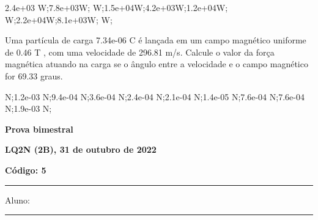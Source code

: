 \documentclass[12pt, addpoints]{exam}
\begin{document}
\begin{questions}
\begin{multicols*}{2}
\begin{oneparchoices}
\choice 2.4e+03 W;\choice 7.8e+03W; W;\choice 1.5e+04W;\choice 4.2e+03W;\choice 1.2e+04W; W;\choice 2.2e+04W;\choice 8.1e+03W; W;\end{oneparchoices}
\question[20] Uma partícula de carga 7.34e-06 C é lançada em um campo magnético uniforme de    0.46 T , com uma velocidade de 296.81 m/s. Calcule o valor da força magnética atuando na carga se o ângulo entre a velocidade e o campo magnético for   69.33 graus.

\begin{oneparchoices}
 N;\choice 1.2e-03 N;\choice 9.4e-04 N;\choice 3.6e-04 N;\choice 2.4e-04 N;\choice 2.1e-04 N;\choice 1.4e-05 N;\choice 7.6e-04 N;\choice 7.6e-04 N;\choice 1.9e-03 N;\end{oneparchoices}
\end{multicols*}
\end{questions}
\newpage
        \begin{minipage}[b]{0.75\linewidth}
            \begin{flushleft}
                {\bf \large Prova bimestral}
            \end{flushleft}
            \begin{flushleft}
                {\bf \large LQ2N (2B), 31 de outubro de 2022}
            \end{flushleft}
        \end{minipage}
        \begin{minipage}[b]{0.20\linewidth}
            \begin{flushright}
                {\bf \large Código: 5}
            \end{flushright}
        \end{minipage}
        \vspace{0.5cm} \hrule \vspace{0.5cm}
        \begin{minipage}{0.75\linewidth}
            Aluno:
        \end{minipage}
        \vspace{0.5cm} \hrule \vspace{0.5cm}
\end{document}
